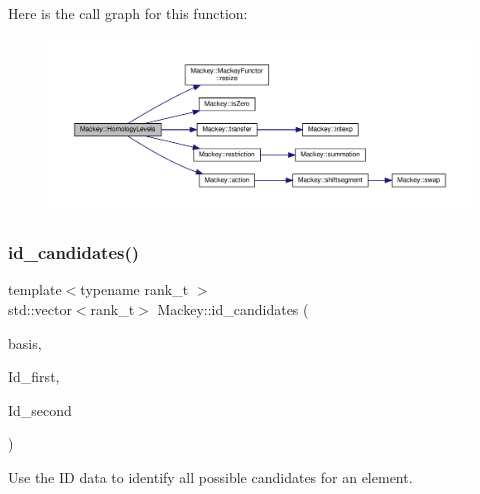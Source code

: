 Here is the call graph for this function\+:\nopagebreak
\begin{figure}[H]
\begin{center}
\leavevmode
\includegraphics[width=350pt]{namespaceMackey_a1c195484cc947abef84c726b534af5a5_cgraph}
\end{center}
\end{figure}
\mbox{\label{namespaceMackey_a83ac78e6d1695af40d0fa58af5255e84}} 
\subsubsection{\texorpdfstring{id\+\_\+candidates()}{id\_candidates()}}
{\footnotesize\ttfamily template$<$typename rank\+\_\+t $>$ \\
std\+::vector$<$rank\+\_\+t$>$ Mackey\+::id\+\_\+candidates (\begin{DoxyParamCaption}\item[{const rank\+\_\+t \&}]{basis,  }\item[{const \hyperlink{classMackey_1_1IDGenerators}{I\+D\+Generators}$<$ rank\+\_\+t $>$ \&}]{Id\+\_\+first,  }\item[{const \hyperlink{classMackey_1_1IDGenerators}{I\+D\+Generators}$<$ rank\+\_\+t $>$ \&}]{Id\+\_\+second }\end{DoxyParamCaption})}



Use the ID data to identify all possible candidates for an element. 

